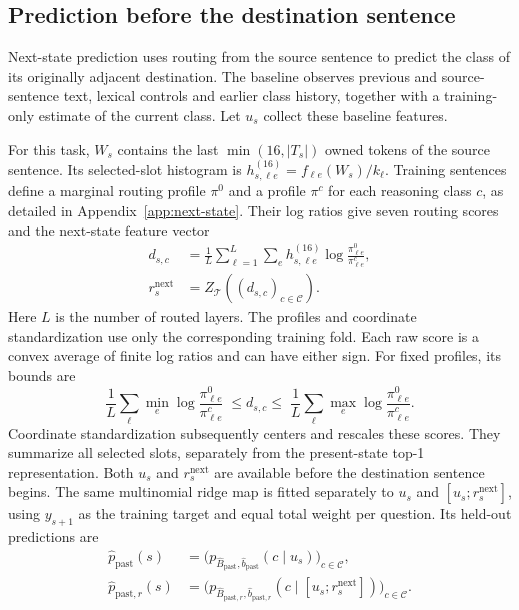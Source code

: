\subsection{Prediction before the destination sentence}
\label{sec:next-method}

Next-state prediction uses routing from the source sentence to predict the class of its originally adjacent destination.
%
The baseline observes previous and source-sentence text, lexical controls and earlier class history, together with a training-only estimate of the current class.
%
Let $u_s$ collect these baseline features.
%

For this task, $W_s$ contains the last $\min(16,|T_s|)$ owned tokens of the source sentence.
%
Its selected-slot histogram is $h^{(16)}_{s,\ell e}=f_{\ell e}(W_s)/k_\ell$.
%
Training sentences define a marginal routing profile $\pi^0$ and a profile $\pi^c$ for each reasoning class $c$, as detailed in Appendix~\ref{app:next-state}.
%
Their log ratios give seven routing scores and the next-state feature vector
\begin{equation}
\begin{aligned}
 d_{s,c}&=\frac{1}{L}\sum_{\ell=1}^{L}\sum_e
 h^{(16)}_{s,\ell e}\log\frac{\pi^0_{\ell e}}{\pi^c_{\ell e}},\\
 r_s^{\mathrm{next}}&=Z_{\mathcal T}\!\left((d_{s,c})_{c\in\mathcal C}\right).
\end{aligned}
\label{eq:next-features}
\end{equation}
Here $L$ is the number of routed layers.
%
The profiles and coordinate standardization use only the corresponding training fold.
%
Each raw score is a convex average of finite log ratios and can have either sign.
%
For fixed profiles, its bounds are
\begin{equation}
 \frac{1}{L}\sum_{\ell}\min_e\log\frac{\pi^0_{\ell e}}{\pi^c_{\ell e}}
 \;\leq d_{s,c}\leq\;
 \frac{1}{L}\sum_{\ell}\max_e\log\frac{\pi^0_{\ell e}}{\pi^c_{\ell e}}.
\end{equation}
Coordinate standardization subsequently centers and rescales these scores.
%
They summarize all selected slots, separately from the present-state top-1 representation.
%
Both $u_s$ and $r_s^{\mathrm{next}}$ are available before the destination sentence begins.
%
The same multinomial ridge map is fitted separately to $u_s$ and $[u_s;r_s^{\mathrm{next}}]$, using $y_{s+1}$ as the training target and equal total weight per question.
%
Its held-out predictions are
\begin{equation}
 \begin{aligned}
 \widehat p_{\mathrm{past}}(s)&=
 \bigl(p_{\widehat B_{\mathrm{past}},\widehat b_{\mathrm{past}}}(c\mid u_s)\bigr)_{c\in\mathcal C},\\
 \widehat p_{\mathrm{past},r}(s)&=
 \bigl(p_{\widehat B_{\mathrm{past},r},\widehat b_{\mathrm{past},r}}
 (c\mid[u_s;r_s^{\mathrm{next}}])\bigr)_{c\in\mathcal C}.
 \end{aligned}
 \label{eq:next-predictions}
\end{equation}
